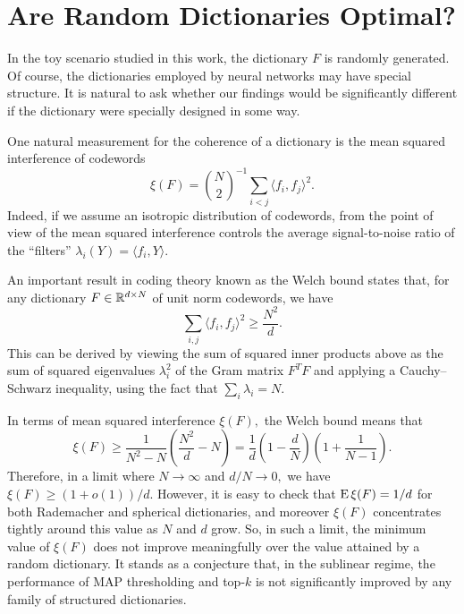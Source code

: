 \section{Are Random Dictionaries Optimal? \label{sec:dictionaries}}

In the toy scenario studied in this work, the dictionary $F$ is randomly generated. Of course, the dictionaries employed by neural networks may have special structure. It is natural to ask whether our findings would be significantly different if the dictionary were specially designed in some way.

One natural measurement for the coherence of a dictionary is the mean squared interference of codewords
$$
\xi(F) = \binom N 2 ^{-1} \sum_{i < j} \langle f_i, f_j \rangle^2.
$$
Indeed, if we assume an isotropic distribution of codewords, from the point of view of  the mean squared interference controls the average signal-to-noise ratio of the ``filters'' $\lambda_i(Y) = \langle f_i, Y \rangle.$

An important result in coding theory known as the Welch bound \citep{welch_lower_1974} states that, for any dictionary $F \in \mathbb{R}^{d \times N}$ of unit norm codewords, we have
$$
\sum_{i, j} \langle f_i, f_j \rangle^2 \ge \frac {N^2} d.
$$
This can be derived by viewing the sum of squared inner products above as the sum of squared eigenvalues $\lambda_i^2$ of the Gram matrix $F^T F$ and applying a Cauchy--Schwarz inequality, using the fact that $\sum_i \lambda_i = N.$

In terms of mean squared interference $\xi(F),$ the Welch bound means that
$$
\xi(F) \ge \frac 1 {N^2 - N} \left( \frac {N^2} d - N \right) = \frac 1 d \left ( 1 - \frac d N \right) \left( 1 + \frac 1 {N - 1} \right).
$$
Therefore, in a limit where $N \to \infty$ and $d/N \to 0,$ we have $\xi(F) \ge (1 + o(1))/d.$ However, it is easy to check that $\operatorname{E} \xi(F) = 1/d$ for both Rademacher and spherical dictionaries, and moreover $\xi(F)$ concentrates tightly around this value as $N$ and $d$ grow. So, in such a limit, the minimum value of $\xi(F)$ does not improve meaningfully over the value attained by a random dictionary. It stands as a conjecture that, in the sublinear regime, the performance of MAP thresholding and top-$k$ is not significantly improved by any family of structured dictionaries.
